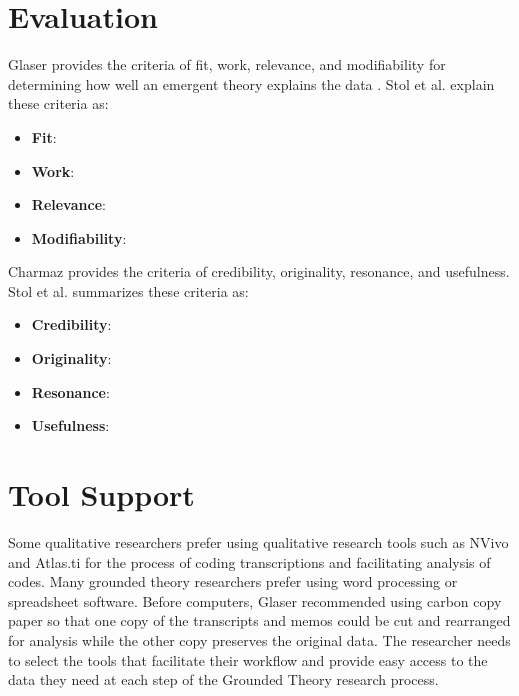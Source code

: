 \section{Evaluation}
Glaser provides the criteria of fit, work, relevance, and modifiability for determining how well an emergent theory explains the data \cite{GlaserTheoreticalSensitivity}. Stol et al.  \cite{StolGroundedTheory} explain these criteria as:
\begin{itemize}
\item \textbf{Fit}:  
\item \textbf{Work}:   
\item\textbf{Relevance}:  
\item \textbf{Modifiability}: 
\end{itemize}

Charmaz provides the criteria of credibility, originality, resonance, and usefulness. Stol et al.  \cite{StolGroundedTheory} summarizes these criteria as:
\begin{itemize}
\item \textbf{Credibility}:  
\item \textbf{Originality}:   
\item\textbf{Resonance}:  
\item \textbf{Usefulness}: 
\end{itemize}

\section{Tool Support}
Some qualitative researchers prefer using qualitative research tools such as NVivo and Atlas.ti for the process of coding transcriptions and facilitating analysis of codes. Many grounded theory researchers prefer using word processing or spreadsheet software. Before computers, Glaser recommended using carbon copy paper so that one copy of the transcripts and memos could be cut and rearranged for analysis while the other copy preserves the original data. The researcher needs to select the tools that facilitate their workflow and provide easy access to the data they need at each step of the Grounded Theory research process.


